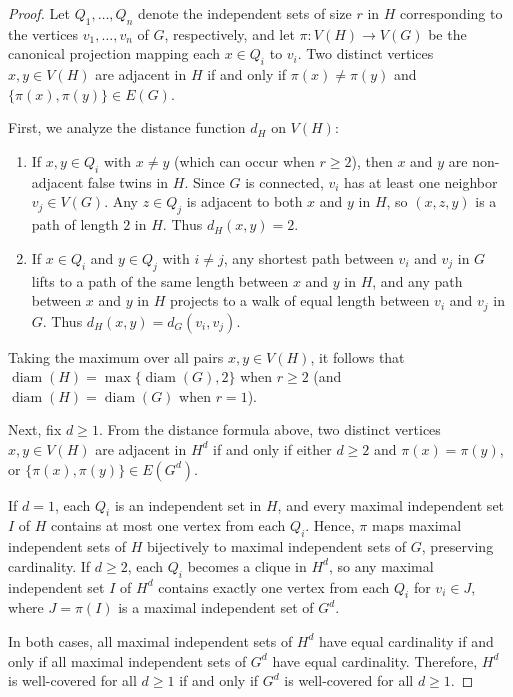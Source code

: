 \documentclass[12pt]{amsart}
\numberwithin{equation}{section}
\theoremstyle{definition}
\begin{document}
\begin{proof}
Let $Q_1, \ldots, Q_n$ denote the independent sets of size $r$ in $H$ corresponding to the vertices $v_1, \ldots, v_n$ of $G$, respectively, and let $\pi: V(H) \to V(G)$ be the canonical projection mapping each $x \in Q_i$ to $v_i$. Two distinct vertices $x, y \in V(H)$ are adjacent in $H$ if and only if $\pi(x) \neq \pi(y)$ and $\{\pi(x),\pi(y)\} \in E(G)$.

First, we analyze the distance function $d_H$ on $V(H)$:
\begin{enumerate}
    \item If $x, y \in Q_i$ with $x \neq y$ (which can occur when $r \ge 2$), then $x$ and $y$ are non-adjacent false twins in $H$. Since $G$ is connected, $v_i$ has at least one neighbor $v_j \in V(G)$. Any $z \in Q_j$ is adjacent to both $x$ and $y$ in $H$, so $(x, z, y)$ is a path of length $2$ in $H$. Thus $d_H(x, y) = 2$.
    \item If $x \in Q_i$ and $y \in Q_j$ with $i \neq j$, any shortest path between $v_i$ and $v_j$ in $G$ lifts to a path of the same length between $x$ and $y$ in $H$, and any path between $x$ and $y$ in $H$ projects to a walk of equal length between $v_i$ and $v_j$ in $G$. Thus $d_H(x, y) = d_G(v_i, v_j)$.
\end{enumerate}

Taking the maximum over all pairs $x, y \in V(H)$, it follows that $\operatorname{diam}(H) = \max\{\operatorname{diam}(G), 2\}$ when $r \ge 2$ (and $\operatorname{diam}(H) = \operatorname{diam}(G)$ when $r = 1$).

Next, fix $d \ge 1$. From the distance formula above, two distinct vertices $x, y \in V(H)$ are adjacent in $H^d$ if and only if either $d \ge 2$ and $\pi(x) = \pi(y)$, or $\{\pi(x), \pi(y)\} \in E(G^d)$. 

If $d = 1$, each $Q_i$ is an independent set in $H$, and every maximal independent set $I$ of $H$ contains at most one vertex from each $Q_i$. Hence, $\pi$ maps maximal independent sets of $H$ bijectively to maximal independent sets of $G$, preserving cardinality. If $d \ge 2$, each $Q_i$ becomes a clique in $H^d$, so any maximal independent set $I$ of $H^d$ contains exactly one vertex from each $Q_i$ for $v_i \in J$, where $J = \pi(I)$ is a maximal independent set of $G^d$.

In both cases, all maximal independent sets of $H^d$ have equal cardinality if and only if all maximal independent sets of $G^d$ have equal cardinality. Therefore, $H^d$ is well-covered for all $d \ge 1$ if and only if $G^d$ is well-covered for all $d \ge 1$.
\end{proof}
\end{document}
